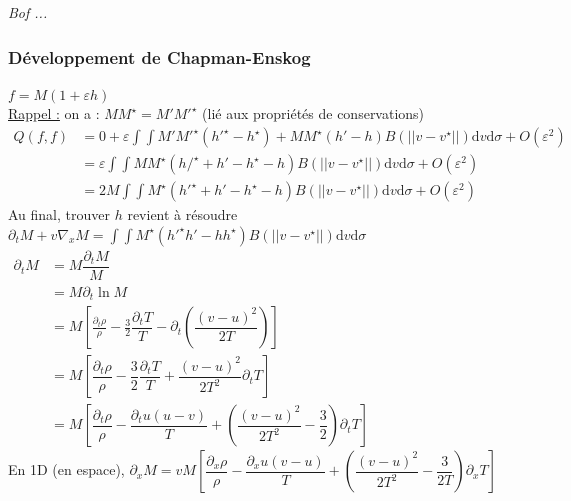 \documentclass[12pt,a4paper]{article}
\begin{document}
\textit{Bof ...}

\subsubsection{Développement de Chapman-Enskog}

$f = M(1+\varepsilon h)$\\
\underline{Rappel :} on a : $MM^\star = M'M'^\star$ (lié aux propriétés de conservations)\\

$\begin{aligned}
	Q(f,f) &= 0 + \varepsilon \displaystyle\int\int M'M'^\star \left(h'^\star - h^\star\right) + MM^\star\left(h'-h\right)B(|\!|v-v^\star|\!|)\mathrm dv \mathrm d\sigma + O(\varepsilon^2)\\
	&= \varepsilon\int\int MM^\star \left(h/^\star+h'-h^\star-h\right)B(|\!|v-v^\star|\!|)\mathrm dv \mathrm d\sigma + O(\varepsilon ^2) \\
	&=2M\displaystyle\int\int M^\star\left(h'^\star+h'-h^\star-h\right)B(|\!|v-v^\star|\!|)\mathrm dv \mathrm d\sigma + O(\varepsilon^2)
\end{aligned}$\\

Au final, trouver $h$  revient à résoudre $\partial_t M + v\nabla_x M = \displaystyle\int\int M^\star \left(h'^\star h' - hh^\star\right)B(|\!|v-v^\star|\!|)\mathrm dv \mathrm d\sigma$\\

$\begin{aligned}
	\partial_t M & = M \dfrac{\partial_t M}{M} \\
	&=M\partial_t\ln M \\
	&= M\left[\frac{\partial_t \rho}\rho - \frac32 \dfrac{\partial_t T}T - \partial_t \left(\dfrac{(v-u)^2}{2T}\right)\right]\\
	&= M\left[\dfrac{\partial_t \rho}\rho - \dfrac32\dfrac{\partial_t T}T + \dfrac{(v-u)^2}{2T^2}\partial_t T\right]\\
	&= M\left[\dfrac{\partial_t \rho}\rho - \dfrac{\partial_t u (u-v)}{T} + \left(\dfrac{(v-u) ^2}{2T^2} - \dfrac3{2}\right)\partial_t T\right]
\end{aligned}$\\

En 1D (en espace), $\partial_x M = vM \left[\dfrac{\partial_x \rho}\rho - \dfrac{\partial_x u(v-u)}T + \left(\dfrac{(v-u)^2}{2T^2}-\dfrac3{2T}\right)\partial_x T\right]$\\
\end{document}
